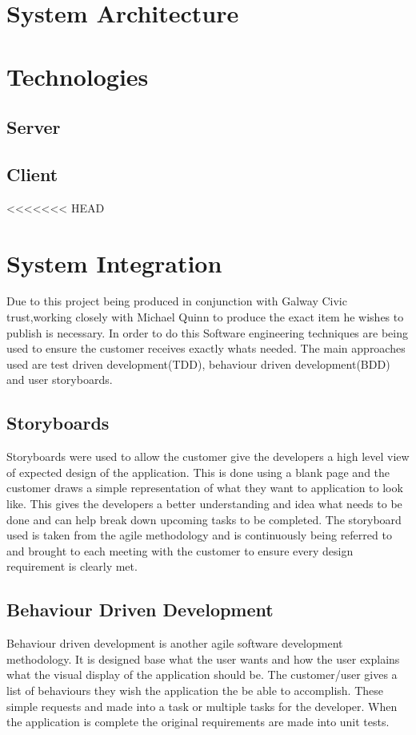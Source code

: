 \section{System Architecture}
\section{Technologies}
\subsection{Server}
\subsection{Client}
<<<<<<< HEAD
\section{System Integration}
Due to this project being produced in conjunction with Galway Civic trust,working closely with Michael Quinn to produce the exact item he wishes to publish is necessary. In order to do this Software engineering techniques are being used to ensure the customer receives exactly whats needed. The main approaches used are test driven development(TDD), behaviour driven development(BDD) and user storyboards.

\subsection{Storyboards}

Storyboards were used to allow the customer give the developers a high level view of expected design of the application. This is done using a blank page and the customer draws a simple representation of what they want to application to look like. This gives the developers a better understanding and idea what needs to be done and can help break down upcoming tasks to be completed. The storyboard used is taken from the agile methodology and is continuously being referred to and brought to each meeting with the customer to ensure every design requirement is clearly met. \cite{StoryBoard}

\subsection{Behaviour Driven Development}

Behaviour driven development is another agile software development methodology. It is designed base what the user wants and how the user explains what the visual display of the application should be. The customer/user gives a list of behaviours they wish the application the be able to accomplish. These simple requests and made into a task or multiple tasks for the developer. When the application is complete the original requirements are made into unit tests.\cite{BDD} 

